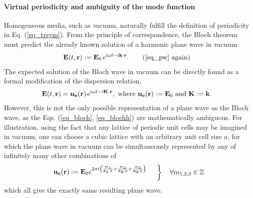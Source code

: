 \paragraph{Virtual periodicity and ambiguity of the mode function}%
Homogeneous media, such as vacuum, naturally fulfill the definition of periodicity in Eq. (\ref{eq_trsym}).
From the principle of correspondence, the Bloch theorem must predict
the already known solution of a harmonic plane wave in vacuum
\begin{equation} \E(t, \rr) := \E_0\, e^{\ii\omega t - \ii\kk\cdot\rr}. \tag{\ref{eq_pw} \again} \end{equation}
The expected solution of the Bloch wave in vacuum can be directly found as a formal modification of the dispersion relation,
\begin{equation}  
\mathbf{E}(t, {\mathbf{r}}) = \mathbf{u_e}({\mathbf{r}})\,\mathrm{e}^{{\mathrm i}\omega t - {\mathrm i}{\mathbf{K}}\cdot{\mathbf{r}}}, \text{ where } \mathbf{u_e}({\mathbf{r}}) := \mathbf{E}_0  \text{ and } {\mathbf{K}} := {\mathbf{k}}.
\label{eq_blochvac}
\end{equation}
However, this is not the only possible representation of a plane wave as the Bloch wave, as the Eqs. (\ref{eq_bloch}, \ref{eq_blochh}) are mathematically ambiguous. 
For illustration, using the fact that any lattice of periodic unit cells may be imagined in vacuum, one can choose a cubic lattice with an arbitrary unit cell size $a$, %
for which the plane wave in vacuum can be simultaneously represented by any of infinitely many other combinations of
\begin{equation} 
\left.  \begin{array}{cc}
	\mathbf{u_{e}}(\rr) := \E_0 e^{2\pi\ii \left(\frac{m_1}{\ava\cdot\rr} + \frac{m_2}{\avb\cdot\rr} + \frac{m_3}{\avc\cdot\rr} \right)} \vspace{2mm} \\ %
\end{array}\quad \right\} \quad \forall m_{1,2,3} \in \mathbb{Z}
\label{eq_blochvac2}
\end{equation}
which all 
give the exactly same resulting plane wave. 

